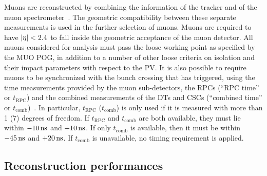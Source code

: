 Muons are reconstructed by combining the information of the tracker
and of the muon
spectrometer~\cite{Sirunyan:2018fpa}.
The geometric compatibility between these separate measurements is
used in the further selection of muons. Muons are required to have
$|\eta|<2.4$ to fall inside the geometric acceptance of the muon
detector.
All muons considered for analysis must pass the loose working point as
specified by the MUO POG, in addition to a number
of other loose criteria on isolation and their impact parameters with
respect to the PV.
It is also possible to require muons to be synchronized with the bunch
crossing that has triggered, using the time measurements provided by
the muon sub-detectors, the RPCs (``RPC time'' or $t_{\mathrm{RPC}}$)
and the combined measurements of the DTs and CSCs (``combined time''
or $t_{\mathrm{comb}}$)~\cite{muon_oot}.
In particular, $t_{\mathrm{RPC}}$ ($t_{\mathrm{comb}}$) is only used
if it is measured with more than 1 (7) degrees of freedom.
If $t_{\mathrm{RPC}}$ and $t_{\mathrm{comb}}$ are both available,
they must lie within $-10\mathrm{\,ns}$ and $+10\mathrm{\,ns}$.
If only $t_{\mathrm{comb}}$ is available, then it must be within
$-45\mathrm{\,ns}$ and $+20\mathrm{\,ns}$.
If $t_{\mathrm{comb}}$ is unavailable, no timing requirement is
applied.

\subsection{Reconstruction performances}
\clearpage
